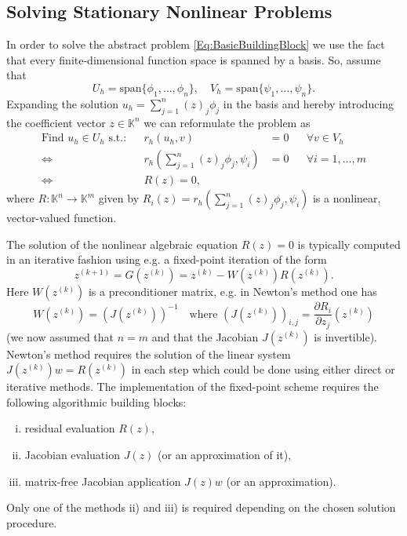 \documentclass[a4paper,12pt]{article}
\theoremstyle{definition}
\begin{document}
\subsection*{Solving Stationary Nonlinear Problems}

In order to solve the abstract problem \eqref{Eq:BasicBuildingBlock} we use the fact that
every finite-dimensional function space is spanned by a basis. So, assume that
\begin{equation*}
U_h=\text{span}\{\phi_1,\ldots,\phi_n\}, \quad V_h=\text{span}\{\psi_1,\ldots,\psi_n\} .
\end{equation*}
Expanding the solution $u_h=\sum_{j=1}^n (z)_j\phi_j$ in the basis and
hereby introducing the coefficient vector $z\in\mathbb{K}^n$ we can
reformulate the problem as
\begin{align*}
\text{Find $u_h\in U_h$ s.t.:} && r_h(u_h,v)&=0 && \forall v\in V_h\\
\Leftrightarrow{} && r_h\left(\sum_{j=1}^n (z)_j\phi_j,\psi_i\right) &= 0 &&\forall i=1,\ldots,m\\
\Leftrightarrow{} && R(z) = 0,
\end{align*}
where $R: \mathbb{K}^n \to \mathbb{K}^m$ given by
$R_i(z) = r_h\left(\sum_{j=1}^n (z)_j\phi_j,\psi_i\right)$ is a nonlinear, vector-valued function.

The solution of the nonlinear algebraic equation $R(z)=0$ is typically computed
in an iterative fashion using e.g. a fixed-point iteration of the form
\begin{equation}
z^{(k+1)} = G(z^{(k)}) = z^{(k)} - W(z^{(k)}) R(z^{(k)}) .
\end{equation}
Here $W(z^{(k)})$ is a preconditioner matrix, e.g. in Newton's method one
has
\begin{equation*}
W(z^{(k)}) = (J(z^{(k)}))^{-1} \quad \text{where $(J(z^{(k)}))_{i,j} = \frac{\partial R_i}{\partial z_j}
(z^{(k)})$}
\end{equation*}
(we now assumed that $n=m$ and that the Jacobian $J(z^{(k)})$ is invertible).
Newton's method requires the solution of the linear system $J(z^{(k)}) w = R(z^{(k)})$ in each
step which could be done using either direct or iterative methods.
The implementation of the fixed-point scheme requires the following
algorithmic building blocks:
\begin{enumerate}[i)]
\item residual evaluation $R(z)$,
\item Jacobian evaluation $J(z)$ (or an approximation of it),
\item matrix-free Jacobian application $J(z) w$ (or an approximation).
\end{enumerate}
Only one of the methods ii) and iii) is required depending on the chosen
solution procedure.
\end{document}
